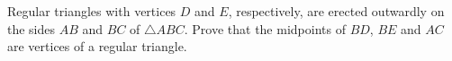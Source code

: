 Regular triangles with vertices $D$ and $E$, respectively, are erected outwardly on the sides $AB$ and $BC$ of $\triangle ABC$. Prove that the midpoints of $BD$, $BE$ and $AC$ are vertices of a regular triangle.
